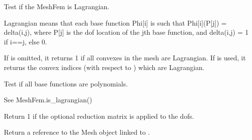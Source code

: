 \documentclass[a4paper,11pt,english]{sphinxmanual}
\begin{document}
\begin{fulllineitems}
\begin{fulllineitems}
\label{\detokenize{python/cmdref_MeshFem:getfem.MeshFem.is_lagrangian}}
Test if the MeshFem is Lagrangian.

Lagrangian means that each base function Phi{[}i{]} is such that
Phi{[}i{]}(P{[}j{]}) = delta(i,j), where P{[}j{]} is the dof location of
the jth base function, and delta(i,j) = 1 if i==j, else 0.

If  is omitted, it returns 1 if all convexes in the mesh
are Lagrangian. If  is used, it returns the convex indices
(with respect to ) which are Lagrangian.

\end{fulllineitems}


\begin{fulllineitems}
\label{\detokenize{python/cmdref_MeshFem:getfem.MeshFem.is_polynomial}}
Test if all base functions are polynomials.

See MeshFem.is\_lagrangian()

\end{fulllineitems}


\begin{fulllineitems}
\label{\detokenize{python/cmdref_MeshFem:getfem.MeshFem.is_reduced}}
Return 1 if the optional reduction matrix is applied to the dofs.

\end{fulllineitems}


\begin{fulllineitems}
\label{\detokenize{python/cmdref_MeshFem:getfem.MeshFem.linked_mesh}}
Return a reference to the Mesh object linked to .


\end{fulllineitems}
\end{fulllineitems}
\end{document}
